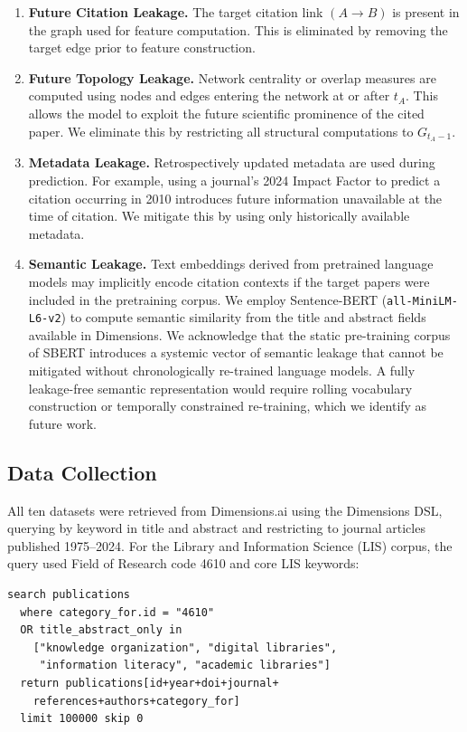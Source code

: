 \documentclass[11pt,a4paper]{article}
\begin{document}
\begin{enumerate}
    \item \textbf{Future Citation Leakage.}
    The target citation link \((A \to B)\) is present in the graph used for feature computation. This is eliminated by removing the target edge prior to feature construction.

    \item \textbf{Future Topology Leakage.}
    Network centrality or overlap measures are computed using nodes and edges entering the network at or after \(t_A\). This allows the model to exploit the future scientific prominence of the cited paper. We eliminate this by restricting all structural computations to \(G_{t_A-1}\).

    \item \textbf{Metadata Leakage.}
    Retrospectively updated metadata are used during prediction. For example, using a journal's 2024 Impact Factor to predict a citation occurring in 2010 introduces future information unavailable at the time of citation. We mitigate this by using only historically available metadata.

    \item \textbf{Semantic Leakage.}
    Text embeddings derived from pretrained language models may implicitly encode citation contexts if the target papers were included in the pretraining corpus. We employ Sentence-BERT (\texttt{all-MiniLM-L6-v2}) to compute semantic similarity from the title and abstract fields available in Dimensions. We acknowledge that the static pre-training corpus of SBERT introduces a systemic vector of semantic leakage that cannot be mitigated without chronologically re-trained language models. A fully leakage-free semantic representation would require rolling vocabulary construction or temporally constrained re-training, which we identify as future work.
\end{enumerate}

\subsection{Data Collection}

All ten datasets were retrieved from Dimensions.ai \citep{hook2018dimensions} using the Dimensions DSL, querying by keyword in title and abstract and restricting to journal articles published 1975--2024. For the Library and Information Science (LIS) corpus, the query used Field of Research code 4610 and core LIS keywords:

\begin{verbatim}
search publications
  where category_for.id = "4610"
  OR title_abstract_only in
    ["knowledge organization", "digital libraries",
     "information literacy", "academic libraries"]
  return publications[id+year+doi+journal+
    references+authors+category_for]
  limit 100000 skip 0
\end{verbatim}
\end{document}
